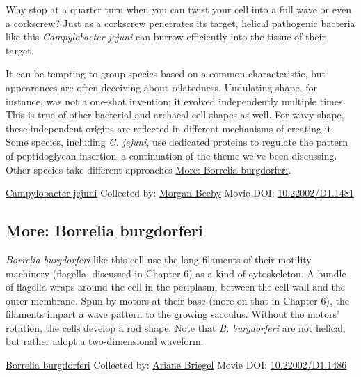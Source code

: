 \documentclass[]{tufte-book}
\begin{document}
Why stop at a quarter turn when you can twist your cell into a full wave or even a corkscrew? Just as a corkscrew penetrates its target, helical pathogenic bacteria like this \emph{Campylobacter jejuni} can burrow efficiently into the tissue of their target.

It can be tempting to group species based on a common characteristic, but appearances are often deceiving about relatedness. Undulating shape, for instance, was not a one-shot invention; it evolved independently multiple times. This is true of other bacterial and archaeal cell shapes as well. For wavy shape, these independent origins are reflected in different mechanisms of creating it. Some species, including \emph{C. jejuni}, use dedicated proteins to regulate the pattern of peptidoglycan insertion--a continuation of the theme we've been discussing. Other species take different approaches \protect\hyperlink{Borrelia_burgdorferi}{More: Borrelia burgdorferi}.



\hypertarget{htmlwidget-c59d6b4d8c98dd81ac4b}{}

\label{fig:3-5}\protect\hyperlink{tree}{Campylobacter jejuni} Collected by: \protect\hyperlink{morgan_beeby}{Morgan Beeby} Movie DOI: \href{https://doi.org/10.22002/D1.1481}{10.22002/D1.1481}

\hypertarget{Borrelia_burgdorferi}{%
\subsection*{More: Borrelia burgdorferi}\label{Borrelia_burgdorferi}}

\emph{Borrelia burgdorferi} like this cell use the long filaments of their motility machinery (flagella, discussed in Chapter 6) as a kind of cytoskeleton. A bundle of flagella wraps around the cell in the periplasm, between the cell wall and the outer membrane. Spun by motors at their base (more on that in Chapter 6), the filaments impart a wave pattern to the growing sacculus. Without the motors' rotation, the cells develop a rod shape. Note that \emph{B. burgdorferi} are not helical, but rather adopt a two-dimensional waveform.



\hypertarget{htmlwidget-4bee198dd6a0cffdb9f8}{}

\label{fig:3-5a}\protect\hyperlink{tree}{Borrelia burgdorferi} Collected by: \protect\hyperlink{ariane_briegel}{Ariane Briegel} Movie DOI: \href{https://doi.org/10.22002/D1.1486}{10.22002/D1.1486}
\end{document}
